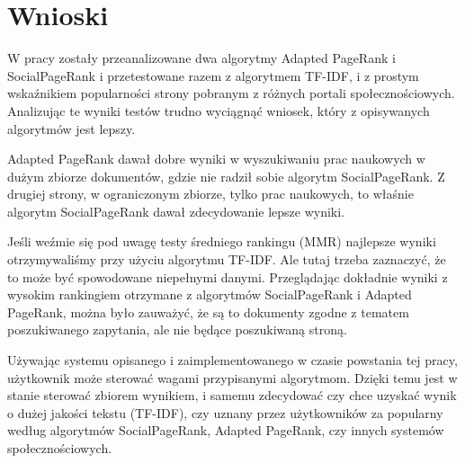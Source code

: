 
\chapter{Wnioski}

W pracy zostały przeanalizowane dwa algorytmy Adapted PageRank i
SocialPageRank i przetestowane razem z algorytmem TF-IDF, i z prostym
wskaźnikiem popularności strony pobranym z różnych portali
społecznościowych. Analizując te wyniki testów trudno wyciągnąć wniosek, który z opisywanych algorytmów jest lepszy.



Adapted PageRank dawał dobre wyniki w wyszukiwaniu prac naukowych w
dużym zbiorze dokumentów, gdzie nie radził sobie algorytm
SocialPageRank. Z drugiej strony, w ograniczonym zbiorze, tylko prac
naukowych, to właśnie algorytm SocialPageRank dawał zdecydowanie lepsze
wyniki. 


Jeśli weźmie się pod uwagę testy średniego rankingu (MMR) najlepsze wyniki otrzymywaliśmy przy użyciu algorytmu TF-IDF. Ale tutaj trzeba zaznaczyć, że to może być spowodowane niepełnymi danymi. Przeglądając dokładnie wyniki z wysokim rankingiem otrzymane z algorytmów SocialPageRank i Adapted PageRank, można było zauważyć, że są to dokumenty zgodne z tematem poszukiwanego zapytania, ale nie będące poszukiwaną stroną.  


Używając systemu opisanego i zaimplementowanego w czasie powstania tej
pracy, użytkownik może sterować wagami przypisanymi algorytmom.
Dzięki temu jest w stanie sterować zbiorem wynikiem, i samemu zdecydować czy chce uzyskać wynik o dużej
jakości tekstu (TF-IDF), czy uznany przez użytkowników za popularny
według algorytmów SocialPageRank, Adapted PageRank, czy innych systemów społecznościowych.